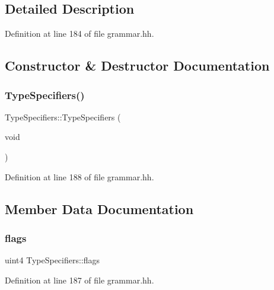 \subsection{Detailed Description}


Definition at line 184 of file grammar.\+hh.



\subsection{Constructor \& Destructor Documentation}
\mbox{\label{struct_type_specifiers_ac613ba61b3796932a0aa204cb375051d}} 
\subsubsection{\texorpdfstring{TypeSpecifiers()}{TypeSpecifiers()}}
{\footnotesize\ttfamily Type\+Specifiers\+::\+Type\+Specifiers (\begin{DoxyParamCaption}\item[{void}]{ }\end{DoxyParamCaption})\hspace{0.3cm}{\ttfamily [inline]}}



Definition at line 188 of file grammar.\+hh.



\subsection{Member Data Documentation}
\mbox{\label{struct_type_specifiers_ae3c1cae0216fef561e4261f50355a3a9}} 
\subsubsection{\texorpdfstring{flags}{flags}}
{\footnotesize\ttfamily uint4 Type\+Specifiers\+::flags}



Definition at line 187 of file grammar.\+hh.

\mbox{\label{struct_type_specifiers_a85855a0fe7fb74ea6d1702bdc0ee346d}} 
